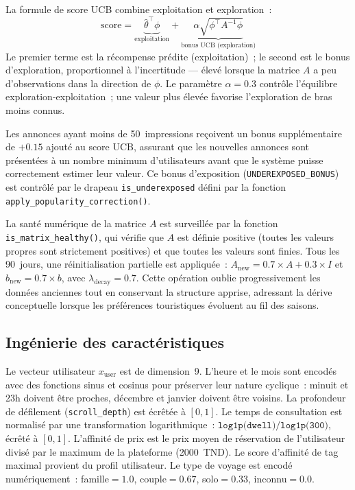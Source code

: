 La formule de score UCB combine exploitation et exploration~:
\begin{equation}
    \text{score} = \underbrace{\hat{\theta}^\top \phi}_{\text{exploitation}} +
    \underbrace{\alpha \sqrt{\phi^\top A^{-1} \phi}}_{\text{bonus UCB (exploration)}}
    \label{eq:ucb_score}
\end{equation}
Le premier terme est la récompense prédite (exploitation)~; le second est le bonus d'exploration,
proportionnel à l'incertitude --- élevé lorsque la matrice $A$ a peu d'observations dans la
direction de $\phi$. Le paramètre $\alpha = 0.3$ contrôle l'équilibre exploration-exploitation~;
une valeur plus élevée favorise l'exploration de bras moins connus.

Les annonces ayant moins de 50~impressions reçoivent un bonus supplémentaire de $+0.15$ ajouté
au score UCB, assurant que les nouvelles annonces sont présentées à un nombre minimum
d'utilisateurs avant que le système puisse correctement estimer leur valeur. Ce bonus
d'exposition (\texttt{UNDEREXPOSED\_BONUS}) est contrôlé par le drapeau
\texttt{is\_underexposed} défini par la fonction \texttt{apply\_popularity\_correction()}.

La santé numérique de la matrice $A$ est surveillée par la fonction \texttt{is\_matrix\_healthy()},
qui vérifie que $A$ est définie positive (toutes les valeurs propres sont strictement positives)
et que toutes les valeurs sont finies. Tous les 90~jours, une réinitialisation partielle est
appliquée~: $A_{\text{new}} = 0.7 \times A + 0.3 \times I$ et $b_{\text{new}} = 0.7 \times b$,
avec $\lambda_{\text{decay}} = 0.7$. Cette opération oublie progressivement les données anciennes
tout en conservant la structure apprise, adressant la dérive conceptuelle lorsque les préférences
touristiques évoluent au fil des saisons.


\subsection{Ingénierie des caractéristiques}

Le vecteur utilisateur $x_{\text{user}}$ est de dimension~9. L'heure et le mois sont encodés
avec des fonctions sinus et cosinus pour préserver leur nature cyclique~: minuit et 23h doivent
être proches, décembre et janvier doivent être voisins. La profondeur de défilement
(\texttt{scroll\_depth}) est écrêtée à $[0, 1]$. Le temps de consultation est normalisé par une
transformation logarithmique~: $\texttt{log1p(dwell)} / \texttt{log1p(300)}$, écrêté à $[0, 1]$.
L'affinité de prix est le prix moyen de réservation de l'utilisateur divisé par le maximum de la
plateforme (2000~TND). Le score d'affinité de tag maximal provient du profil utilisateur. Le
type de voyage est encodé numériquement~: famille$=1.0$, couple$=0.67$, solo$=0.33$,
inconnu$=0.0$.

